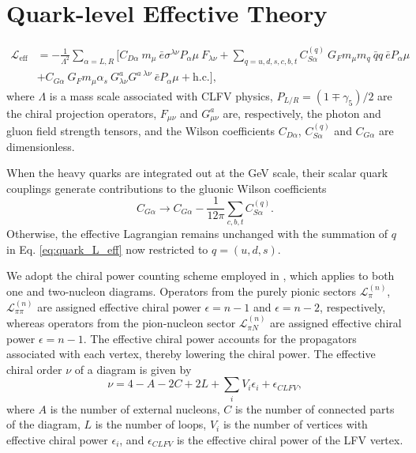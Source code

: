 \documentclass{book}[12pt]
\begin{document}
\section{Quark-level Effective Theory}
\begin{equation}
\begin{split}
\mathcal{L}_\mathrm{eff}&=-\frac{1}{\Lambda^2}\sum_{\alpha=L,R}\bigg[C_{D\alpha}~m_{\mu}~\bar{e}\sigma^{\lambda\nu}P_{\alpha}\mu~F_{\lambda\nu}+\sum_{q=u,d,s,c,b,t}C^{(q)}_{S\alpha}~G_Fm_{\mu}m_q~\bar{q}q~\bar{e}P_{\alpha}\mu\\
&+C_{G\alpha}~G_Fm_{\mu}\alpha_s~G^a_{\lambda\nu}G^{a\;\lambda\nu}~\bar{e}P_{\alpha}\mu+\mathrm{h.c.}\bigg],
\label{eq:quark_L_eff}
\end{split}
\end{equation}
where $\Lambda$ is a mass scale associated with CLFV physics, $P_{L/R}=\left(1\mp \gamma_5\right)/2$ are the chiral projection operators, $F_{\mu\nu}$ and $G^a_{\mu\nu}$ are, respectively, the photon and gluon field strength tensors, and the Wilson coefficients $C_{D\alpha}$, $C_{S\alpha}^{(q)}$ and $C_{G\alpha}$ are dimensionless. 

When the heavy quarks are integrated out at the GeV scale, their scalar quark couplings generate contributions to the gluonic Wilson coefficients
\begin{equation}
C_{G\alpha}\rightarrow C_{G\alpha}-\frac{1}{12\pi}\sum_{c,b,t}C^{(q)}_{S\alpha}.
\end{equation}
Otherwise, the effective Lagrangian remains unchanged with the summation of $q$ in Eq. \ref{eq:quark_L_eff} now restricted to $q=(u,d,s)$. 

We adopt the chiral power counting scheme employed in \cite{2018PhRvC..98a5208B}, which applies to both one and two-nucleon diagrams. Operators from the purely pionic sectors $\mathcal{L}^{(n)}_{\pi}$, $\mathcal{L}^{(n)}_{\pi\pi}$ are assigned effective chiral power $\epsilon=n-1$ and $\epsilon=n-2$, respectively, whereas operators from the pion-nucleon sector $\mathcal{L}^{(n)}_{\pi N}$ are assigned effective chiral power $\epsilon=n-1$. The effective chiral power accounts for the propagators associated with each vertex, thereby lowering the chiral power. The effective chiral order $\nu$ of a diagram is given by
\begin{equation}
\nu=4-A-2C+2L+\sum_i V_i\epsilon_i + \epsilon_{CLFV},
\end{equation}
where $A$ is the number of external nucleons, $C$ is the number of connected parts of the diagram, $L$ is the number of loops, $V_i$ is the number of vertices with effective chiral power $\epsilon_i$, and $\epsilon_{CLFV}$ is the effective chiral power of the LFV vertex.
\end{document}
